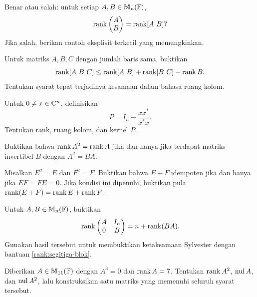 \begin{latihan}\label{rank:lat-gabungan}
    Benar atau salah: untuk setiap $A,B\in\mathbb{M}_n(\mathbb{F})$,
    \[
        \rank\begin{pmatrix}A\\B\end{pmatrix}=\rank[A\ B]?
    \]
    Jika salah, berikan contoh eksplisit terkecil yang memungkinkan.
\end{latihan}

\begin{latihan}\label{rank:lat-tiga-ruang}
    Untuk matriks $A,B,C$ dengan jumlah baris sama, buktikan
    \[
        \rank[A\ B\ C]\le\rank[A\ B]+\rank[B\ C]-\rank B.
    \]
    Tentukan syarat tepat terjadinya kesamaan dalam bahasa ruang kolom.
\end{latihan}

\begin{latihan}\label{rank:lat-proyeksi}
    Untuk $0\ne x\in\mathbb{C}^n$, definisikan
    \[
        P=I_n-\frac{xx^*}{x^*x}.
    \]
    Tentukan rank, ruang kolom, dan kernel $P$.
\end{latihan}

\begin{latihan}\label{rank:lat-stabil}
    Buktikan bahwa $\operatorname{rank} A^2=\operatorname{rank} A$ jika dan hanya jika terdapat
    matriks invertibel $B$ dengan $A^2=BA$.
\end{latihan}

\begin{latihan}\label{rank:lat-dua-idempoten}
    Misalkan $E^2=E$ dan $F^2=F$. Buktikan bahwa $E+F$ idempoten
    jika dan hanya jika $EF=FE=0$. Jika kondisi ini dipenuhi,
    buktikan pula $\operatorname{rank}(E+F)=\operatorname{rank} E+\operatorname{rank} F$.
\end{latihan}

\begin{latihan}\label{rank:lat-blok-identitas}
    Untuk $A,B\in\mathbb{M}_n(\mathbb{F})$, buktikan
    \[
        \operatorname{rank}\begin{pmatrix}A&I_n\\0&B\end{pmatrix}=n+\operatorname{rank}(BA).
    \]
    Gunakan hasil tersebut untuk membuktikan ketaksamaan Sylvester
    dengan bantuan \autoref{rank:segitiga-blok}.
\end{latihan}

\begin{latihan}\label{rank:lat-nilpoten}
    Diberikan $A\in\mathbb{M}_{11}(\mathbb{F})$ dengan $A^3=0$ dan $\operatorname{rank} A=7$.
    Tentukan $\operatorname{rank} A^2$, $\operatorname{nul} A$, dan $\operatorname{nul} A^2$, lalu konstruksikan
    satu matriks yang memenuhi seluruh syarat tersebut.
\end{latihan}

